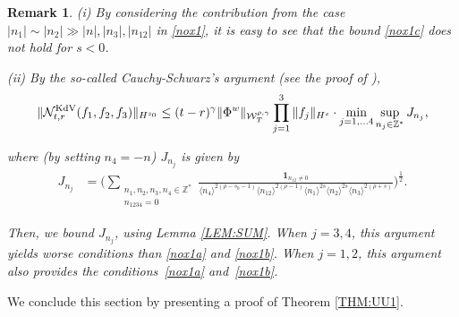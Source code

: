 \documentclass[letterpaper, 11pt,  reqno]{amsart}
\newtheorem{remark}[theorem]{Remark}
\newcommand{\1}{\hspace{0.5mm}\text{I}\hspace{0.5mm}}
\newcommand{\noi}{\noindent}
\newcommand{\Z}{\mathbb{Z}}
\newcommand{\g}{\gamma}
\newcommand{\jb}[1]
{\langle #1 \rangle}
\newcommand{\ind}{\mathbf 1}
\newcommand{\NN}{\mathcal{N}}
\newcommand{\W}{\mathcal{W}}
\newcommand{\KDV}{\text{\rm KdV} }
\numberwithin{equation}{section}
\numberwithin{theorem}{section}
\begin{document}
\begin{remark}\label{REM:non1}\rm
(i) By considering the contribution from 
the case $|n_1|\sim |n_2|\gg |n|, |n_3|, |n_{12}|$
in \eqref{nox1}, 
it is easy to see that the 
bound \eqref{nox1c} does not hold for $s < 0$.


\smallskip

\noi
(ii) 
By  the so-called Cauchy-Schwarz's argument
(see the proof of \cite[Proposition 4.1]{CGLLO1}), 
\begin{align*}
 \|\NN^\KDV_{t, r}(f_1, f_2, f_3)\|_{H^{s_0}}
 \le
(t-r)^\g  \|\Phi^w\|_{  \W^{\rho,\g}_T} 
\prod_{j = 1}^3\|f_j\|_{H^s}
\cdot \min_{j = 1, \dots 4}\sup_{n_j \in \Z^*} J_{n_j}, 
\end{align*}


\noi
where (by setting $n_4 = -n$) $J_{n_j}$ is given by 
\begin{align*}
J_{n_j} 
& = \bigg(
\sum_{\substack{n_1, n_2, n_3, n_4 \in \Z^*\\ n_{1234}= 0}}
\frac{\ind_{n_{12}\ne 0}}{\jb{n_4}^{2(\rho-s_0 - 1)}
\jb{n_{12}}^{2(\rho-1)}
\jb{n_1}^{2s}\jb{n_2}^{2s}\jb{n_3}^{2(\rho+s)}} 
 \bigg)^\frac{1}{2}.
\end{align*}


\noi
Then, we  bound $J_{n_j}$, using Lemma \ref{LEM:SUM}.
When $j = 3, 4$, 
this argument yields worse conditions than \eqref{nox1a} and \eqref{nox1b}.
When $j = 1, 2$, 
this argument also provides the conditions~\eqref{nox1a} and~\eqref{nox1b}.




\end{remark}












We conclude this section by  presenting a proof of Theorem \ref{THM:UU1}.
\end{document}
